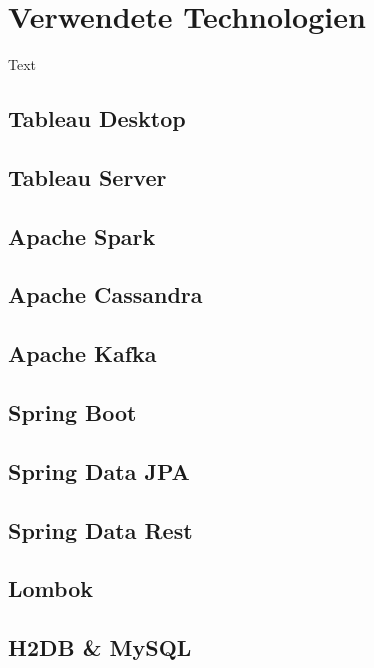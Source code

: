 

\section{Verwendete Technologien} 

Text

\subsection{Tableau Desktop}

\subsection{Tableau Server}

\subsection{Apache Spark}

\subsection{Apache Cassandra}

\subsection{Apache Kafka}

\subsection{Spring Boot}

\subsection{Spring Data JPA}

\subsection{Spring Data Rest}

\subsection{Lombok}

\subsection{H2DB \& MySQL}

